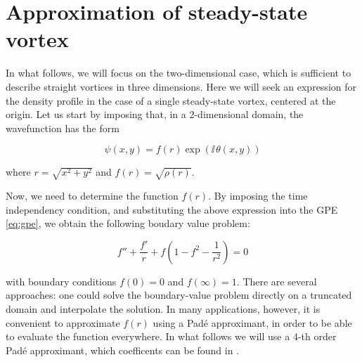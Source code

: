 \section{Approximation of steady-state vortex}

In what follows, we will focus on the two-dimensional case, which is sufficient to describe straight vortices in three dimensions. Here we will seek an expression for the density profile in the case of a single steady-state vortex, centered at the origin. Let us start by imposing that, in a 2-dimensional domain, the wavefunction has the form

\[
    \psi(x,y)=f(r)\exp\left(\ii\,\theta(x,y)\right)
\]

where $r = \sqrt{x^2 + y^2}$ and $f(r) = \sqrt{\rho(r)}$.

Now, we need to determine the function $f(r)$. By imposing the time independency condition, and substituting the above expression into the GPE \eqref{eq:gpe}, we obtain the following boudary value problem:

\begin{equation}
    f'' + \frac{f'}{r} + f\left(1 - f^2 - \frac{1}{r^2}\right) = 0
    \label{eq:density}
\end{equation}

with boundary conditions $f(0)=0$ and $f(\infty)=1$. There are several approaches: one could solve the boundary-value problem directly on a truncated domain and interpolate the solution. In many applications, however, it is convenient to approximate $f(r)$ using a Padé approximant, in order to be able to evaluate the function everywhere. In what follows we will use a 4-th order Padé approximant, which coefficents can be found in \cite{CZ18}.


